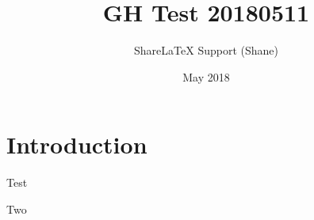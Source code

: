 \documentclass{article}
\title{GH Test 20180511}
\author{ShareLaTeX Support (Shane)}
\date{May 2018}
\begin{document}
\maketitle

\section{Introduction}

Test

Two
\end{document}

